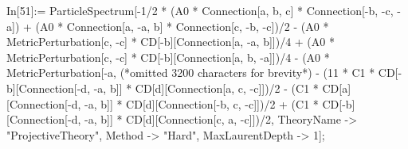 In[51]:= ParticleSpectrum[-1/2 * (A0 * Connection[a, b, c] * Connection[-b, -c, -a]) + (A0 * Connection[a, -a, b] * Connection[c, -b, -c])/2 - (A0 * MetricPerturbation[c, -c] * CD[-b][Connection[a, -a, b]])/4 + (A0 * MetricPerturbation[c, -c] * CD[-b][Connection[a, b, -a]])/4 - (A0 * MetricPerturbation[-a, (*omitted 3200 characters for brevity*) - (11 * C1 * CD[-b][Connection[-d, -a, b]] * CD[d][Connection[a, c, -c]])/2 - (C1 * CD[a][Connection[-d, -a, b]] * CD[d][Connection[-b, c, -c]])/2 + (C1 * CD[-b][Connection[-d, -a, b]] * CD[d][Connection[c, a, -c]])/2, TheoryName -> "ProjectiveTheory", Method -> "Hard", MaxLaurentDepth -> 1];